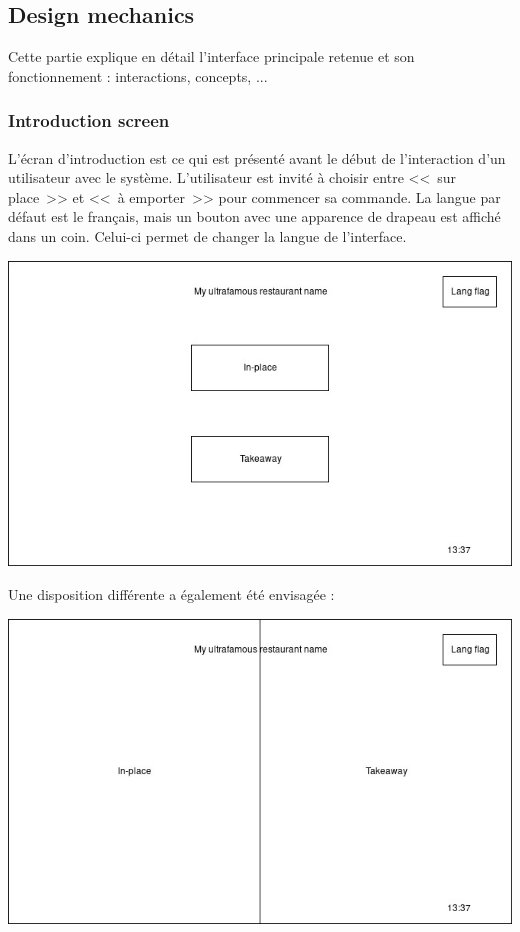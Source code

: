 \documentclass[a4paper,12pt]{article}
\begin{document}
\subsection{Design mechanics}

Cette partie explique en détail l'interface principale retenue et son fonctionnement : interactions, concepts, ...

\subsubsection{Introduction screen}

L'écran d'introduction est ce qui est présenté avant le début de l'interaction d'un utilisateur avec le système.
L'utilisateur est invité à choisir entre <<~sur place~>> et <<~à emporter~>> pour commencer sa commande. La langue par
défaut est le français, mais un bouton avec une apparence de drapeau est affiché dans un coin. Celui-ci permet de
changer la langue de l'interface.

\begin{center}
	\includegraphics[width=\textwidth]{intro_screen.jpg}
\end{center}

Une disposition différente a également été envisagée :

\begin{center}
	\includegraphics[width=\textwidth]{alt_intro_screen.jpg}
\end{center}
\end{document}
